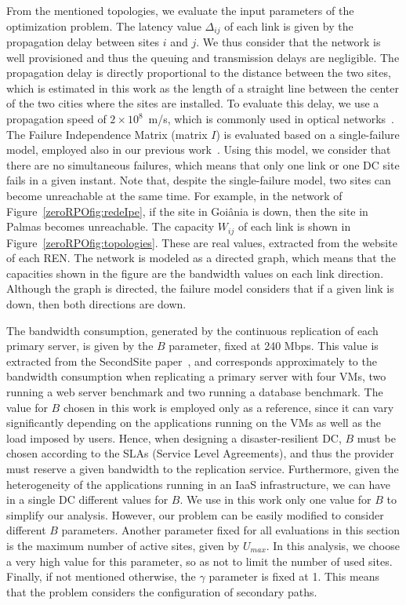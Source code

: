 \documentclass[preprint]{elsarticle}
\begin{document}
From the mentioned topologies, we evaluate the input parameters of the optimization problem.
The latency value $\Delta_{ij}$ of each link is given by the propagation delay between sites $i$ and $j$.
We thus consider that the network is well provisioned and thus the queuing and transmission delays are negligible.
The propagation delay is directly proportional to the distance between the two sites, which is estimated in this work as the length of a straight line between the center of the two cities where the sites are installed. To evaluate this delay, we use a propagation speed of $2 \times 10^8$~m/s, which is commonly used in optical networks~\cite{couto2014Latency}. The Failure Independence Matrix (matrix $I$) is evaluated based on a single-failure model, employed also in our previous work~\cite{couto2014Latency}. Using this model, we consider that there are no simultaneous failures, which means that only one link or one DC site fails in a given instant. Note that, despite the single-failure model, two sites can become unreachable at the same time. For example, in the network of Figure~\ref{zeroRPOfig:redeIpe}, if the site in Goi\^ania is down, then the site in Palmas becomes unreachable. The capacity $W_{ij}$ of each link is shown in Figure~\ref{zeroRPOfig:topologies}. These are real values, extracted from the website of each REN. The network is modeled as a directed graph, which means that the capacities shown in the figure are the bandwidth values on each link direction. Although the graph is directed, the failure model considers that if a given link is down, then both directions are down.

The bandwidth consumption, generated by the continuous replication of each primary server, is given by the $B$ parameter, fixed at 240 Mbps. 
This value is extracted from the SecondSite paper~\cite{rajagopalan2012secondsite}, and corresponds approximately to the bandwidth consumption when replicating a primary server with four VMs, two running a web server benchmark and two running a database benchmark. 
The value for $B$ chosen in this work is employed only as a reference, since it can vary significantly depending on the applications running on the VMs as well as the load imposed by users. Hence, when designing a disaster-resilient DC, $B$ must be chosen according to the SLAs (Service Level Agreements), and thus the provider must reserve a given bandwidth to the replication service. Furthermore, given the heterogeneity of the applications running in an IaaS infrastructure, we can have in a single DC different values for $B$. We use in this work only one value for $B$ to simplify our analysis. However, our problem can be easily modified to consider different $B$ parameters. Another parameter fixed for all evaluations in this section is the maximum number of active sites, given by $U_{max}$. In this analysis, we choose a very high value for this parameter, so as not to limit the number of used sites. Finally, if not mentioned otherwise, the $\gamma$ parameter is fixed at 1. This means that the problem considers the configuration of secondary paths.
\end{document}
